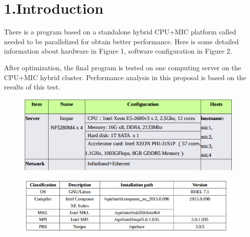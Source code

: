 \documentclass{article}
\begin{document}
\section{1.\hspace*{0.5em}Introduction}\label{sec-introduction}%

\noindent{}There is a program based on a standalone hybrid CPU+MIC platform called  needed to be parallelized for obtain better performance. Here is some detailed information about hardware in Figure 1, software configuration in Figure 2.%

After optimization, the final program is tested on one computing server on the CPU+MIC hybrid cluster. Performance analysis in this proposal is based on the results of this test.%

\begin{figure}[tbp]%
\begin{mdcenter}%

\noindent{}\includegraphics[keepaspectratio=true,width=\dimmin{}{\dimwidth{0.90}}]{images/2016-02-18-23-01-13-}{}%

\mdhr{}%

\noindent{}%
\end{mdcenter}\label{fig-myfigure}%
\end{figure}%

\begin{figure}[tbp]%
\begin{mdcenter}%

\noindent{}\includegraphics[keepaspectratio=true,width=\dimmin{}{\dimwidth{0.90}}]{images/2016-02-18-23-13-11-}{}%

\mdhr{}%

\noindent{}%
\end{mdcenter}\label{fig-myfigure}%
\end{figure}%
\end{document}
